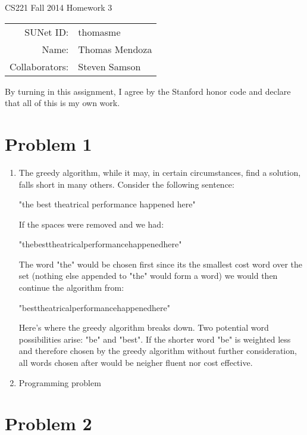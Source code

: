 \documentclass[12pt]{article}
\begin{document}
\begin{center}
{\Large CS221 Fall 2014 Homework 3}

\begin{tabular}{rl}
SUNet ID: & thomasme \\
Name: & Thomas Mendoza \\
Collaborators: & Steven Samson
\end{tabular}
\end{center}

By turning in this assignment, I agree by the Stanford honor code and declare
that all of this is my own work.

\section*{Problem 1}

\begin{enumerate}[label=(\alph*)]
	\item The greedy algorithm, while it may, in certain circumstances,
		find a solution, falls short in many others. Consider the
		following sentence:

		"the best theatrical performance happened here"

		If the spaces were removed and we had:

		"thebesttheatricalperformancehappenedhere"

		The word "the" would be chosen first since its the smallest cost
		word over the set (nothing else appended to "the" would form a word)
		we would then continue the algorithm from:

		"besttheatricalperformancehappenedhere"

		Here's where the greedy algorithm breaks down. Two potential word
		possibilities arise: "be" and "best". If the shorter word "be" is
		weighted less and therefore chosen by the greedy algorithm
		without further consideration, all words
		chosen after would be neigher fluent nor cost effective.

	\item Programming problem


\end{enumerate}

\section*{Problem 2}
\end{document}
